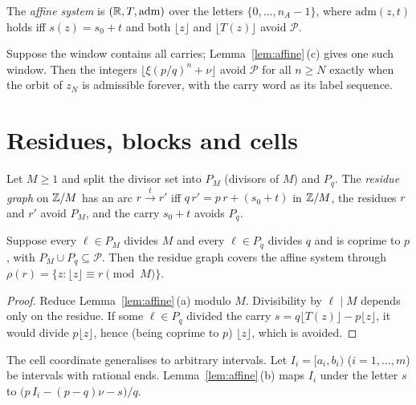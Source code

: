 \begin{definition}\label{def:affine-system}
The \emph{affine system} is \((\mathbb{R},T,\mathrm{adm})\) over the letters \(\{0,\dots,n_A-1\}\),
where \(\mathrm{adm}(z,t)\) holds iff \(s(z)=s_0+t\) and both \(\lfloor z\rfloor\) and
\(\lfloor T(z)\rfloor\) avoid \(\mathcal P\).
\end{definition}

Suppose the window contains all carries; Lemma~\ref{lem:affine}\,(c) gives one such window.
Then the integers \(\lfloor\xi(p/q)^n+\nu\rfloor\) avoid \(\mathcal P\) for all \(n\ge N\)
exactly when the orbit of \(z_N\) is admissible forever, with the carry word as its label
sequence.

\section{Residues, blocks and cells}

\begin{definition}\label{def:residue}
Let \(M\ge1\) and split the divisor set into \(P_M\) (divisors of \(M\)) and \(P_q\). The
\emph{residue graph} on \(\mathbb{Z}/M\) has an arc \(r\xrightarrow{t}r'\) iff
\(q\,r'=p\,r+(s_0+t)\) in \(\mathbb{Z}/M\), the residues \(r\) and \(r'\) avoid \(P_M\), and the carry
\(s_0+t\) avoids \(P_q\).
\end{definition}

\begin{proposition}\label{prop:cover-residue}
Suppose every \(\ell\in P_M\) divides \(M\) and every \(\ell\in P_q\) divides \(q\) and is
coprime to \(p\), with \(P_M\cup P_q\subseteq\mathcal P\). Then the residue graph covers the
affine system through \(\rho(r)=\{z:\lfloor z\rfloor\equiv r\pmod M\}\).
\end{proposition}

\begin{proof}
Reduce Lemma~\ref{lem:affine}\,(a) modulo \(M\). Divisibility by \(\ell\mid M\) depends only on
the residue. If some \(\ell\in P_q\) divided the carry
\(s=q\lfloor T(z)\rfloor-p\lfloor z\rfloor\), it would divide \(p\lfloor z\rfloor\), hence (being coprime to \(p\))
\(\lfloor z\rfloor\), which is avoided.
\end{proof}

The cell coordinate generalises to arbitrary intervals. Let \(I_i=[a_i,b_i)\)
(\(i=1,\dots,m\)) be intervals with rational ends. Lemma~\ref{lem:affine}\,(b) maps \(I_i\)
under the letter \(s\) to \(\bigl(p\,I_i-(p-q)\nu-s\bigr)/q\).


